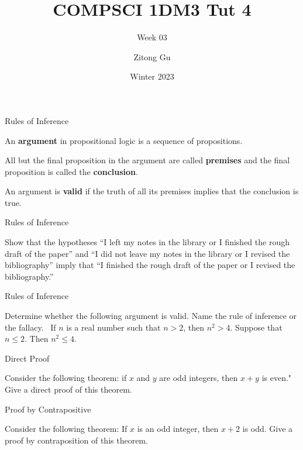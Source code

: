 \documentclass{beamer}
\title{COMPSCI 1DM3 Tut 4}
\subtitle{Week 03}
\author{Zitong Gu}
\institute{McMaster University}
\date{Winter 2023}
\begin{document}
\frame{\titlepage}

\begin{frame}{Rules of Inference}
    \begin{definition}
        An \textbf{argument} in propositional logic is a sequence of propositions.
    \end{definition}
    \begin{definition}
        All but the final proposition in the argument are called \textbf{premises} and the final proposition is called the \textbf{conclusion}.
    \end{definition}
    \begin{definition}
        An argument is \textbf{valid} if the truth of all its premises implies that the conclusion is true.
    \end{definition}
\end{frame}

\begin{frame}[t]{Rules of Inference}
    \begin{example}
        Show that the hypotheses ``I left my notes in the library or I finished the rough draft of the paper'' and ``I did not leave my notes in the library or I revised the bibliography'' imply that ``I finished the rough draft of the paper or I revised the bibliography.''
    \end{example}
\end{frame}

\begin{frame}[t]{Rules of Inference}
    \begin{example}
        Determine whether the following argument is valid. Name the rule of inference or the fallacy. \
        If $n$ is a real number such that $n > 2$, then $n^2 > 4$. Suppose that $n \leq 2$. Then $n^2 \leq 4$.
    \end{example}
\end{frame}

\begin{frame}[t]{Direct Proof}
    \begin{example}
        Consider the following theorem: if $x$ and $y$ are odd integers, then $x + y$ is even." Give a direct proof of this theorem.
    \end{example}
\end{frame}

\begin{frame}[t]{Proof by Contrapositive}
    \begin{example}
        Consider the following theorem: If $x$ is an odd integer, then $x + 2$ is odd. Give a proof by contraposition of this theorem.
    \end{example}
\end{frame}
\end{document}
